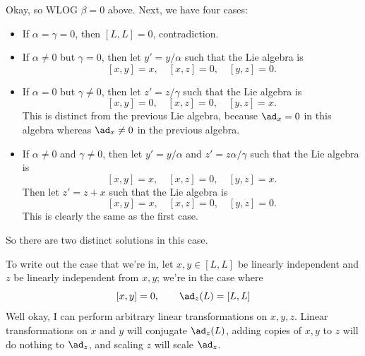 \documentclass[11pt, headheight=30pt]{scrartcl}
\begin{document}
Okay, so WLOG $\beta = 0$ above. Next, we have four cases:
\begin{itemize}
    \item If $\alpha = \gamma = 0$, then $[L,L] = 0$, contradiction.
    \item If $\alpha \neq 0$ but $\gamma = 0$, then let $y' = y/\alpha$
    such that the Lie algebra is
    \[
        [x,y] = x, \quad [x,z] = 0, \quad [y,z] = 0.    
    \]
    \item If $\alpha = 0$ but $\gamma \neq 0$, then let $z' = z/\gamma$
    such that the Lie algebra is
    \[
        [x,y] = 0, \quad [x,z] = 0, \quad [y,z] = x.
    \]
    This is distinct from the previous Lie algebra, because $\ad_x = 0$
    in this algebra whereas $\ad_x \neq 0$ in the previous algebra.
    \item If $\alpha \neq 0$ and $\gamma \neq 0$, then let $y' = y/\alpha$
    and $z' = z\alpha/\gamma$ such that the Lie algebra is
    \[
        [x,y] = x, \quad [x,z] = 0, \quad [y,z] = x.
    \]
    Then let $z' = z + x$ such that the Lie algebra is
    \[
        [x,y] = x, \quad [x,z] = 0, \quad [y,z] = 0.
    \]
    This is clearly the same as the first case.
\end{itemize}

So there are two distinct solutions in this case.

\begin{rcase*}
\end{rcase*}
To write out the case that we're in,
let $x,y \in [L,L]$ be linearly independent and $z$ be linearly independent
from $x,y$; we're in the case where
\[
    [x,y] = 0, \qquad \ad_z(L) = [L,L]    
\]
Well okay, I can perform arbitrary linear transformations
on $x,y,z$. Linear transformations on $x$ and $y$ will
conjugate $\ad_z(L)$, adding copies of $x,y$ to $z$ will
do nothing to $\ad_z$, and scaling $z$ will scale $\ad_z$.
\end{document}
